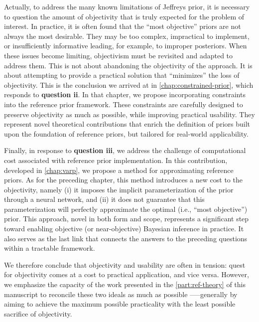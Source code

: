 Actually, to address the many known limitations of Jeffreys prior, it is necessary to question the amount of objectivity that is truly expected for the problem of interest. %
In practice, it is often found that the ``most objective'' priors are not always the most desirable. They may be too complex, impractical to implement, or insufficiently informative leading, for example, to improper posteriors. 
When these issues become limiting, objectivism must be revisited and adapted to address them. This is not about abandoning the objectivity of the approach. It is about attempting to provide a practical solution that ``minimizes'' the loss of objectivity.
%
%
This is the conclusion we arrived at in \cref{chap:constrained-prior}, which responds to \textbf{question ii}.
In that chapter, we propose incorporating constraints into the reference prior framework. These constraints are carefully designed to preserve objectivity as much as possible, while improving practical usability. They represent novel theoretical contributions that enrich the definition of priors built upon the foundation of reference priors, but tailored for real-world applicability.

Finally, in response to \textbf{question iii}, we address the challenge of computational cost associated with reference prior implementation. In this contribution, developed in \cref{chap:varp}, we propose a method for approximating reference priors. As for the preceding chapter, this method introduces a new cost to the objectivity, namely (i) it imposes the implicit parameterization of the prior through a neural network, and (ii) it does not guarantee that this parameterization will perfectly approximate the optimal (i.e., ``most objective'') prior. %
This approach, novel in both form and scope, represents a significant step toward enabling objective (or near-objective) Bayesian inference in practice. It also serves as the last link that connects the answers to the preceding questions within a tractable framework.

We therefore conclude that objectivity and usability are often in tension: quest for objectivity comes at a cost to practical application, and vice versa. However, we emphasize the capacity of the work presented in the \cref{part:ref-theory} of this manuscript to reconcile these two ideals as much as possible —--generally by %
aiming to achieve the maximum possible practicality 
with the least possible sacrifice of objectivity.








